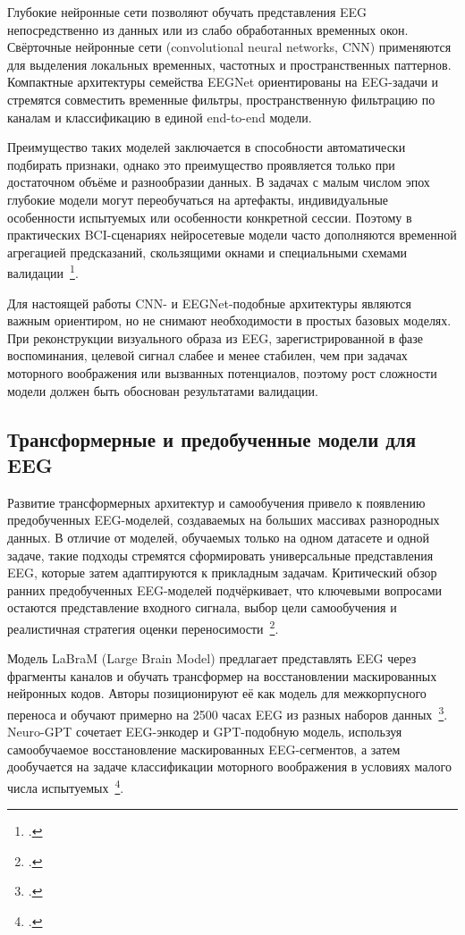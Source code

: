 Глубокие нейронные сети позволяют обучать представления EEG непосредственно из данных или из слабо обработанных временных окон. Свёрточные нейронные сети (convolutional neural networks, CNN) применяются для выделения локальных временных, частотных и пространственных паттернов. Компактные архитектуры семейства EEGNet ориентированы на EEG-задачи и стремятся совместить временные фильтры, пространственную фильтрацию по каналам и классификацию в единой end-to-end модели.

Преимущество таких моделей заключается в способности автоматически подбирать признаки, однако это преимущество проявляется только при достаточном объёме и разнообразии данных. В задачах с малым числом эпох глубокие модели могут переобучаться на артефакты, индивидуальные особенности испытуемых или особенности конкретной сессии. Поэтому в практических BCI-сценариях нейросетевые модели часто дополняются временной агрегацией предсказаний, скользящими окнами и специальными схемами валидации~\footcite{10.1109/jsen.2023.3270281}.

Для настоящей работы CNN- и EEGNet-подобные архитектуры являются важным ориентиром, но не снимают необходимости в простых базовых моделях. При реконструкции визуального образа из EEG, зарегистрированной в фазе воспоминания, целевой сигнал слабее и менее стабилен, чем при задачах моторного воображения или вызванных потенциалов, поэтому рост сложности модели должен быть обоснован результатами валидации.

\subsection{Трансформерные и предобученные модели для EEG}

Развитие трансформерных архитектур и самообучения привело к появлению предобученных EEG-моделей, создаваемых на больших массивах разнородных данных. В отличие от моделей, обучаемых только на одном датасете и одной задаче, такие подходы стремятся сформировать универсальные представления EEG, которые затем адаптируются к прикладным задачам. Критический обзор ранних предобученных EEG-моделей подчёркивает, что ключевыми вопросами остаются представление входного сигнала, выбор цели самообучения и реалистичная стратегия оценки переносимости~\footcite{10.1088/1741-2552/ae4455}.

Модель LaBraM (Large Brain Model) предлагает представлять EEG через фрагменты каналов и обучать трансформер на восстановлении маскированных нейронных кодов. Авторы позиционируют её как модель для межкорпусного переноса и обучают примерно на 2500 часах EEG из разных наборов данных~\footcite{10.48550/arXiv.2405.18765}. Neuro-GPT сочетает EEG-энкодер и GPT-подобную модель, используя самообучаемое восстановление маскированных EEG-сегментов, а затем дообучается на задаче классификации моторного воображения в условиях малого числа испытуемых~\footcite{10.48550/arXiv.2311.03764}.

